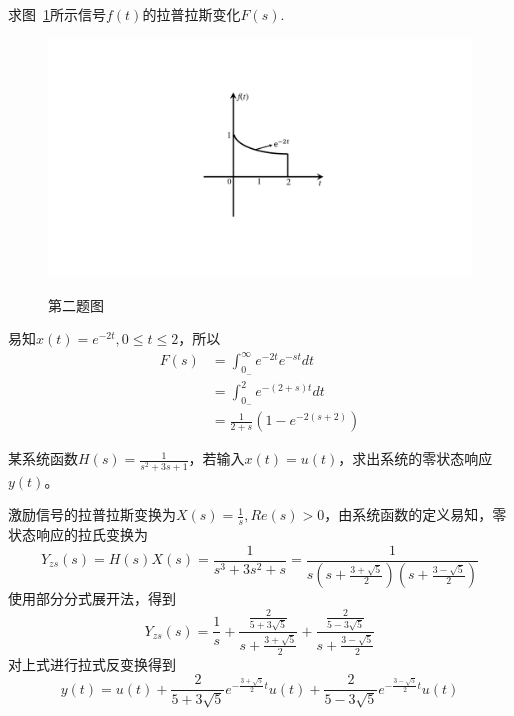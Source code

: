 \documentclass[answers]{exam}  %
\begin{document}
\begin{questions}
\question 求图~\ref{Figure:question_2}所示信号$f(t)$的拉普拉斯变化$F(s)$.
\begin{figure}[!h]
	\centering
	\includegraphics[width=0.3\linewidth]{pics/question_2.pdf}
	\label{Figure:question_2}
	\caption{第二题图}
\end{figure}
\begin{solution}
	易知$x(t)=e^{-2t},0\leq t\leq 2$，所以\begin{align*}
		F(s)&=\int_{0_-}^{\infty}e^{-2t}e^{-st}dt\\
		&=\int_{0_-}^{2}e^{-(2+s)t}dt\\
		&=\frac{1}{2+s}(1-e^{-2(s+2)})
	\end{align*}
\end{solution}

\question 某系统函数$H(s)=\frac{1}{s^2+3s+1}$，若输入$x(t)=u(t)$，求出系统的零状态响应$y(t)$。
\begin{solution}
激励信号的拉普拉斯变换为$X(s)=\frac{1}{s},Re(s)>0$，由系统函数的定义易知，零状态响应的拉氏变换为$$Y_{zs}(s)=H(s)X(s)=\frac{1}{s^3+3s^2+s}=\frac{1}{s(s+\frac{3+\sqrt{5}}{2})(s+\frac{3-\sqrt{5}}{2})}$$使用部分分式展开法，得到$$Y_{zs}(s)=\frac{1}{s}+\frac{\frac{2}{5+3\sqrt{5}}}{s+\frac{3+\sqrt{5}}{2}}+\frac{\frac{2}{5-3\sqrt{5}}}{s+\frac{3-\sqrt{5}}{2}}$$
对上式进行拉式反变换得到$$y(t)=u(t)+\frac{2}{5+3\sqrt{5}}e^{-\frac{3+\sqrt{5}}{2}t}u(t)+\frac{2}{5-3\sqrt{5}}e^{-\frac{3-\sqrt{5}}{2}t}u(t)$$
\end{solution}


\end{questions}
\end{document}
